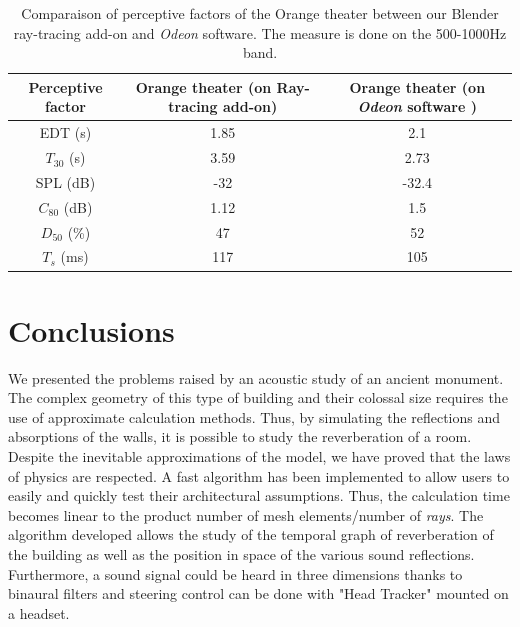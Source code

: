 \documentclass[AMA,STIX1COL]{WileyNJD-v2}
\begin{document}
\begin{table}[h]
\centering
 \begin{tabular}{| *{3}{c|}} 
 \hline 
 Perceptive factor & Orange theater (on Ray-tracing add-on) & Orange theater (on \textit{Odeon} software \cite{odeon})   \\ 
 \hline 
 \hline 
  EDT (s)& 1.85& 2.1 \\ 
 \hline 
$T_{30}$ (s)& 3.59&  2.73\\ 
 \hline 
SPL (dB) &-32 & -32.4\\ 
 \hline 
$C_{80}$ (dB)& 1.12&1.5  \\ 
 \hline 
$D_{50}$ (\%)&47 & 52 \\ 
 \hline 
$T_s$ (ms)&117 & 105 \\ 
 \hline 
\end{tabular} 
 \caption{Comparaison of perceptive factors of the Orange theater between our Blender ray-tracing add-on and \textit{Odeon} software. The measure is done on the 500-1000Hz band.}
 \label{tab_rindel} 
 \end{table}

\section{Conclusions}

We presented the problems raised by an acoustic study of an ancient monument. The complex geometry of this type of building and their colossal size requires the use of approximate calculation methods. Thus, by simulating the reflections and absorptions of the walls, it is possible to study the reverberation of a room. Despite the inevitable approximations of the model, we have proved that the laws of physics are respected. A fast algorithm has been implemented to allow users to easily and quickly test their architectural assumptions. Thus, the calculation time becomes linear to the product number of mesh elements/number of \textit{rays}. The algorithm developed allows the study of the temporal graph of reverberation of the building as well as the position in space of the various sound reflections. Furthermore, a sound signal could be heard in three dimensions thanks to binaural filters and steering control can be done with "Head Tracker" mounted on a headset.
\end{document}
